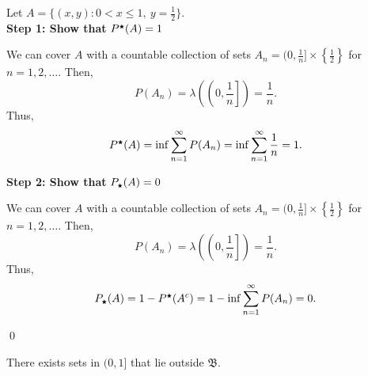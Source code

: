 \begin{proofline}
    Let $A = \{(x, y) : 0 < x \leq 1,\ y = \frac{1}{2}\}$.\\
    \textbf{Step 1: Show that } $P^{\medstar}(A) = 1$
    \vspace{-1ex}
    \begin{proofline}
        We can cover $A$ with a countable collection of sets $A_n = (0, \frac{1}{n}] \times \left\{\frac{1}{2}\right\}$ for $n = 1, 2, \ldots$.
        Then,
        \[
            P(A_n) = \lambda\left(\left(0, \frac{1}{n}\right]\right) = \frac{1}{n}.
        \]
        Thus,
        \[
            P^{\medstar}(A) = \inf\sum_{n=1}^{\infty} P(A_n) = \inf\sum_{n=1}^{\infty} \frac{1}{n} = 1.
        \]
        
    \end{proofline}
    
    \textbf{Step 2: Show that } $P_{\medstar}(A) = 0$
    \vspace{-2ex}
    \begin{proofline}
       We can cover $A$ with a countable collection of sets $A_n = (0, \frac{1}{n}] \times \left\{\frac{1}{2}\right\}$ for $n = 1, 2, \ldots$.
        Then,
        \[
            P(A_n) = \lambda\left(\left(0, \frac{1}{n}\right]\right) = \frac{1}{n}.
        \]
        Thus,
        \[
            P_{\medstar}(A) = 1 - P^{\medstar}(A^c) = 1 - \inf\sum_{n=1}^{\infty} P(A_n) = 0.
        \]
      \end{proofline}
    \hfill\qed
\end{proofline}

\newpage

 \quad

    There exists sets in $(0,1]$ that lie outside $\mathfrak{B}$.
    
